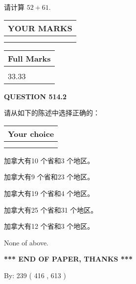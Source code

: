\documentclass{ctexart}
\begin{document}
  
 
请计算 $ %
52 +  %
61 $.
 

 

 
  
\vspace{0.2in}
  
\noindent\begin{tabular}{|l|}
\hline
 YOUR MARKS  \\
\hline
 \\ 
 \\ 
\hline
\end{tabular}
\hspace{0.05in} \begin{tabular}{|l|}
\hline
 Full Marks  \\
\hline
 \\ 
33.33 \\
\hline
\end{tabular}
{\textbf{\Large{QUESTION
514.2 
}}}
  
  
请从如下的陈述中选择正确的：
  
  
\noindent\hspace{3.0in} \begin{tabular}{|l|}
\hline
Your choice \\
\hline
 \\ 
 \\ 
\hline
\end{tabular}
  
  
 
 
加拿大有10 个省和3 个地区。
 
 
加拿大有9 个省和23 个地区。
 
 
加拿大有19 个省和4 个地区。
 
 
加拿大有25 个省和31 个地区。
 
 
加拿大有12 个省和3 个地区。
 
 
 None of above.
 
 
   
   
 \vspace{0.2in}
 
   
   
   
   
\vspace{1.0in} 
{\textbf{\large{ *** END OF PAPER, THANKS *** }}} 
   
   
\hspace{1.0in} By: 
 239 ( 416 ,  613 )
   
\end{document}
